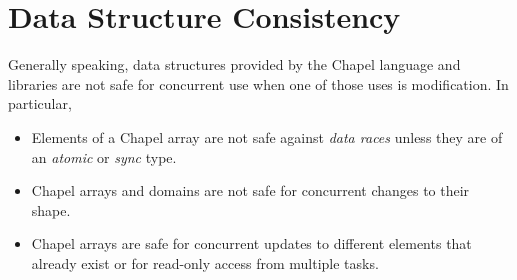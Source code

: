 %
%
%
% 

\section{Data Structure Consistency}

Generally speaking, data structures provided by the Chapel language and
libraries are not safe for concurrent use when one of those uses is
modification. In particular, 

\begin{itemize}

\item Elements of a Chapel array are not safe against \textit{data races}
unless they are of an \textit{atomic} or \textit{sync} type.

\item Chapel arrays and domains are not safe for concurrent changes to
their shape.

\item Chapel arrays are safe for concurrent updates to different elements
that already exist or for read-only access from multiple tasks.

\end{itemize}

